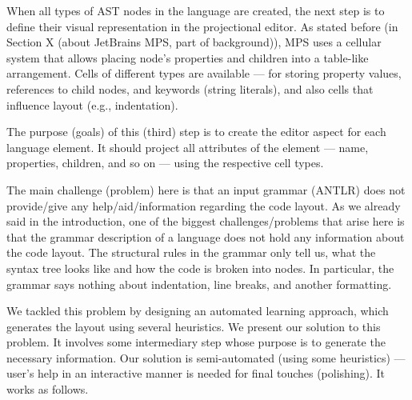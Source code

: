 When all types of AST nodes in the language are created, the next step is to define their visual representation in the projectional editor.
As stated before (in Section X (about JetBrains MPS, part of background)), MPS uses a cellular system that allows placing node's properties and children into a table-like arrangement.
Cells of different types are available --- for storing property values, references to child nodes, and keywords (string literals), and also cells that influence layout (e.g., indentation).

The purpose (goals) of this (third) step is to create the editor aspect for each language element.
It should project all attributes of the element --- name, properties, children, and so on --- using the respective cell types.

The main challenge (problem) here is that an input grammar (ANTLR) does not provide/give any help/aid/information regarding the code layout.
As we already said in the introduction, one of the biggest challenges/problems that arise here is that the grammar description of a language does not hold any information about the code layout.
The structural rules in the grammar only tell us, what the syntax tree looks like and how the code is broken into nodes.
In particular, the grammar says nothing about indentation, line breaks, and another formatting.

We tackled this problem by designing an automated learning approach, which generates the layout using several heuristics.
We present our solution to this problem. It involves some intermediary step whose purpose is to generate the necessary information.
Our solution is semi-automated (using some heuristics) --- user's help in an interactive manner is needed for final touches (polishing).
It works as follows.

